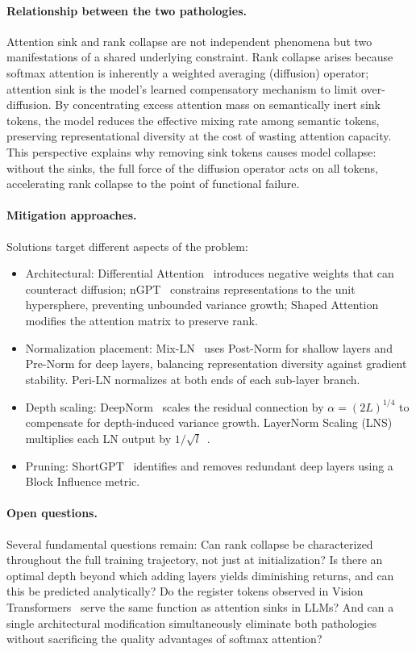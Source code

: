 \paragraph{Relationship between the two pathologies.}
Attention sink and rank collapse are not independent phenomena but two manifestations of a shared underlying constraint. Rank collapse arises because softmax attention is inherently a weighted averaging (diffusion) operator; attention sink is the model's learned compensatory mechanism to limit over-diffusion. By concentrating excess attention mass on semantically inert sink tokens, the model reduces the effective mixing rate among semantic tokens, preserving representational diversity at the cost of wasting attention capacity. This perspective explains why removing sink tokens causes model collapse: without the sinks, the full force of the diffusion operator acts on all tokens, accelerating rank collapse to the point of functional failure.

\paragraph{Mitigation approaches.}
Solutions target different aspects of the problem:
\begin{itemize}[nosep]
\item Architectural: Differential Attention~\cite{ye2024differential} introduces negative weights that can counteract diffusion; nGPT~\cite{loshchilov2024ngpt} constrains representations to the unit hypersphere, preventing unbounded variance growth; Shaped Attention~\cite{noci2023shaped} modifies the attention matrix to preserve rank.
\item Normalization placement: Mix-LN~\cite{chen2024mixln} uses Post-Norm for shallow layers and Pre-Norm for deep layers, balancing representation diversity against gradient stability. Peri-LN normalizes at both ends of each sub-layer branch.
\item Depth scaling: DeepNorm~\cite{wang2024deepnet} scales the residual connection by $\alpha = (2L)^{1/4}$ to compensate for depth-induced variance growth. LayerNorm Scaling (LNS) multiplies each LN output by $1/\sqrt{l}$~\cite{sun2025curse}.
\item Pruning: ShortGPT~\cite{men2024shortgpt} identifies and removes redundant deep layers using a Block Influence metric.
\end{itemize}

\paragraph{Open questions.}
Several fundamental questions remain: Can rank collapse be characterized throughout the full training trajectory, not just at initialization? Is there an optimal depth beyond which adding layers yields diminishing returns, and can this be predicted analytically? Do the register tokens observed in Vision Transformers~\cite{darcet2024vision} serve the same function as attention sinks in LLMs? And can a single architectural modification simultaneously eliminate both pathologies without sacrificing the quality advantages of softmax attention?


